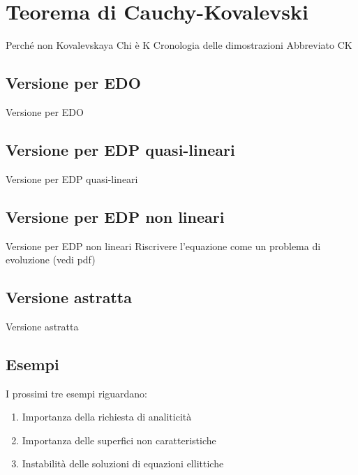 \chapter{Teorema di Cauchy-Kovalevski}
Perché non Kovalevskaya
Chi è K
Cronologia delle dimostrazioni
Abbreviato CK
\section{Versione per EDO}
Versione per EDO
\section{Versione per EDP quasi-lineari}
Versione per EDP quasi-lineari
\section{Versione per EDP non lineari}
Versione per EDP non lineari
Riscrivere l'equazione come un problema di evoluzione (vedi pdf)
\section{Versione astratta}
Versione astratta
\section{Esempi}

I prossimi tre esempi riguardano:
\begin{enumerate}[1]
\item Importanza della richiesta di analiticità
\item Importanza delle superfici non caratteristiche
\item Instabilità delle soluzioni di equazioni ellittiche
\end{enumerate}

\setcounter{example}{0}


\begin{example}

\end{example}



